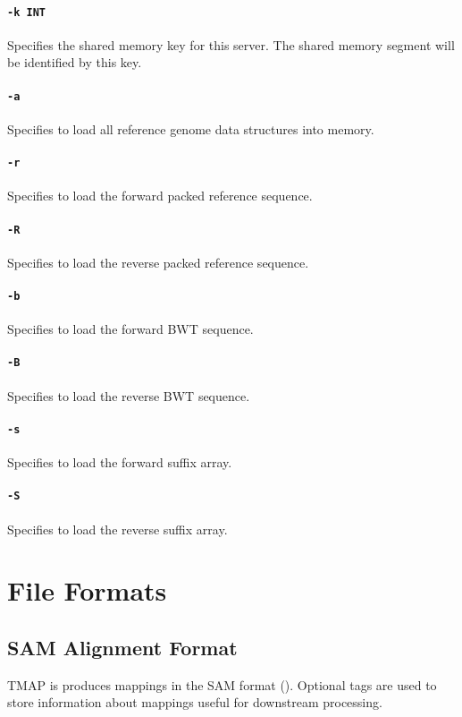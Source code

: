 \documentclass[a4paper,12pt]{book}
\newcommand{\TT}[1]{{\tt #1}} %
\begin{document}
\subsubsection{\TT{-k INT}}
Specifies the shared memory key for this server.
The shared memory segment will be identified by this key.

\subsubsection{\TT{-a}}
Specifies to load all reference genome data structures into memory.

\subsubsection{\TT{-r}}
Specifies to load the forward packed reference sequence.

\subsubsection{\TT{-R}}
Specifies to load the reverse packed reference sequence.

\subsubsection{\TT{-b}}
Specifies to load the forward BWT sequence.

\subsubsection{\TT{-B}}
Specifies to load the reverse BWT sequence.

\subsubsection{\TT{-s}}
Specifies to load the forward suffix array.

\subsubsection{\TT{-S}}
Specifies to load the reverse suffix array.

\chapter{File Formats}

\section{SAM Alignment Format}
\label{sec:samformat}
TMAP is produces mappings in the SAM format (\cite{SAM-format}).
Optional tags are used to store information about mappings useful for downstream processing.
\end{document}
